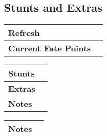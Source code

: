 \documentclass[12pt,a4paper]{article}
\newcommand{\MyTextField}[2][]{%
  \TextField[borderwidth=0,backgroundcolor={},#1]{#2}%
}
\begin{document}
\newpage
\subsection*{Stunts and Extras}
\begin{tabular}{|l|m{2cm}|}
\hline
\textbf{Refresh} & \MyTextField[name=Refresh,width=\linewidth]{}\\ \hline
\textbf{Current Fate Points} & \MyTextField[name=CurrentFatePoints,width=\linewidth]{}\\ \hline
\end{tabular}

\vspace{1.5cm}

\begin{tabularx}{\linewidth}{|l|X|}
\hline
\textbf{Stunts} & \MyTextField[multiline=true,name=Stunts,width=\linewidth,height=6cm]{}\\ 
\hline
\textbf{Extras} & \MyTextField[multiline=true,name=Extras,width=\linewidth,height=6cm]{} \\ 
\hline
\textbf{Notes} & \MyTextField[multiline=true,name=Notes,width=\linewidth,height=10cm]{} \\ 
\hline
\end{tabularx}

\newpage

\begin{tabularx}{\linewidth}{|l|X|}
\hline
\textbf{Notes} & \MyTextField[multiline=true,name=Notes,width=\linewidth,height=26cm]{} \\ 
\hline
\end{tabularx}
\end{document}
